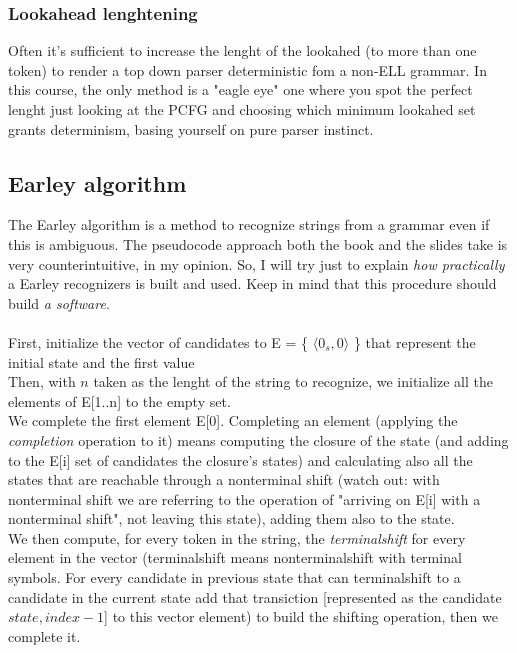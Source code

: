 \documentclass[10pt,a4paper]{article}
\begin{document}
				\subsubsection{Lookahead lenghtening}
					Often it's sufficient to increase the lenght of the lookahed (to more than one token) to render a top down parser deterministic fom a non-ELL grammar. In this course, the only method is a "eagle eye" one where you spot the perfect lenght just looking at the PCFG and choosing which minimum lookahed set grants determinism, basing yourself on pure parser instinct.
					
			\subsection{Earley algorithm}
				The Earley algorithm is a method to recognize strings from a grammar even if this is ambiguous. The pseudocode approach both the book and the slides take is very counterintuitive, in my opinion. So, I will try just to explain \emph{how practically} a Earley recognizers is built and used. Keep in mind that this procedure should build \emph{a software}.\\\\
 				First, initialize the vector of candidates to E = \{ $\langle 0_s, 0 \rangle$ \} that represent the initial state and the first value\\
 				Then, with $n$ taken as the lenght of the string to recognize, we initialize all the elements of E[1..n] to the empty set.\\
 				We complete the first element E[0]. Completing an element (applying the \emph{completion} operation to it) means computing the closure of the state (and adding to the E[i] set of candidates the closure's states) and calculating also all the states that are reachable through a nonterminal shift (watch out: with nonterminal shift we are referring to the operation of "arriving on E[i] with a nonterminal shift", not leaving this state), adding them also to the state.\\
 				We then compute, for every token in the string, the \emph{terminalshift} for every element in the vector (terminalshift means nonterminalshift with terminal symbols. For every candidate in previous state that can terminalshift to a candidate in the current state add that transiction [represented as the candidate $state, index - 1$] to this vector element) to build the shifting operation, then we complete it.\\\\
\end{document}
